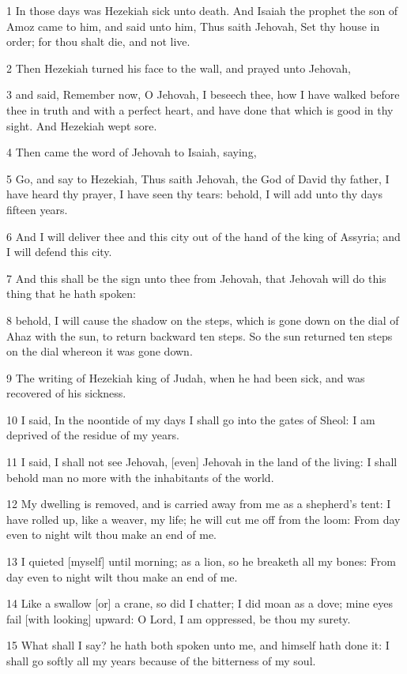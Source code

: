 \par 1 In those days was Hezekiah sick unto death. And Isaiah the prophet the son of Amoz came to him, and said unto him, Thus saith Jehovah, Set thy house in order; for thou shalt die, and not live.
\par 2 Then Hezekiah turned his face to the wall, and prayed unto Jehovah,
\par 3 and said, Remember now, O Jehovah, I beseech thee, how I have walked before thee in truth and with a perfect heart, and have done that which is good in thy sight. And Hezekiah wept sore.
\par 4 Then came the word of Jehovah to Isaiah, saying,
\par 5 Go, and say to Hezekiah, Thus saith Jehovah, the God of David thy father, I have heard thy prayer, I have seen thy tears: behold, I will add unto thy days fifteen years.
\par 6 And I will deliver thee and this city out of the hand of the king of Assyria; and I will defend this city.
\par 7 And this shall be the sign unto thee from Jehovah, that Jehovah will do this thing that he hath spoken:
\par 8 behold, I will cause the shadow on the steps, which is gone down on the dial of Ahaz with the sun, to return backward ten steps. So the sun returned ten steps on the dial whereon it was gone down.
\par 9 The writing of Hezekiah king of Judah, when he had been sick, and was recovered of his sickness.
\par 10 I said, In the noontide of my days I shall go into the gates of Sheol: I am deprived of the residue of my years.
\par 11 I said, I shall not see Jehovah, [even] Jehovah in the land of the living: I shall behold man no more with the inhabitants of the world.
\par 12 My dwelling is removed, and is carried away from me as a shepherd's tent: I have rolled up, like a weaver, my life; he will cut me off from the loom: From day even to night wilt thou make an end of me.
\par 13 I quieted [myself] until morning; as a lion, so he breaketh all my bones: From day even to night wilt thou make an end of me.
\par 14 Like a swallow [or] a crane, so did I chatter; I did moan as a dove; mine eyes fail [with looking] upward: O Lord, I am oppressed, be thou my surety.
\par 15 What shall I say? he hath both spoken unto me, and himself hath done it: I shall go softly all my years because of the bitterness of my soul.
